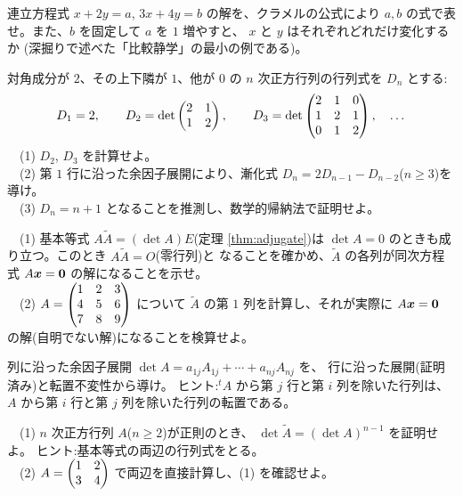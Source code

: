 \begin{mondai}[標準]\label{q:cof-ex8}
連立方程式 $x + 2y = a$, $3x + 4y = b$ の解を、クラメルの公式により
$a, b$ の式で表せ。また、$b$ を固定して $a$ を $1$ 増やすと、
$x$ と $y$ はそれぞれどれだけ変化するか
(深掘りで述べた「比較静学」の最小の例である)。
\end{mondai}

\begin{mondai}[発展]\label{q:cof-ex9}
対角成分が $2$、その上下隣が $1$、他が $0$ の $n$ 次正方行列の行列式を
$D_n$ とする:
\[
D_1 = 2, \qquad D_2 = \det \begin{pmatrix}2 & 1 \\ 1 & 2\end{pmatrix}, \qquad
D_3 = \det \begin{pmatrix}2 & 1 & 0 \\ 1 & 2 & 1 \\ 0 & 1 & 2\end{pmatrix}, \quad \dots
\]
　(1) $D_2$, $D_3$ を計算せよ。\\
　(2) 第 $1$ 行に沿った余因子展開により、漸化式
$D_n = 2D_{n-1} - D_{n-2}$($n \ge 3$)を導け。\\
　(3) $D_n = n + 1$ となることを推測し、数学的帰納法で証明せよ。
\end{mondai}

\begin{mondai}[発展]\label{q:cof-ex10}
　(1) 基本等式 $A\widetilde{A} = (\det A)E$(定理 \ref{thm:adjugate})は
$\det A = 0$ のときも成り立つ。このとき $A\widetilde{A} = O$(零行列)と
なることを確かめ、$\widetilde{A}$ の各列が同次方程式
$A\bm{x} = \bm{0}$ の解になることを示せ。\\
　(2) $A = \begin{pmatrix}1 & 2 & 3 \\ 4 & 5 & 6 \\ 7 & 8 & 9\end{pmatrix}$ について
$\widetilde{A}$ の第 $1$ 列を計算し、それが実際に
$A\bm{x} = \bm{0}$ の解(自明でない解)になることを検算せよ。
\end{mondai}

\begin{mondai}[証明]\label{q:cof-ex11}
列に沿った余因子展開
$\det A = a_{1j} A_{1j} + \cdots + a_{nj} A_{nj}$ を、
行に沿った展開(証明済み)と転置不変性から導け。
ヒント:${}^t\!A$ から第 $j$ 行と第 $i$ 列を除いた行列は、
$A$ から第 $i$ 行と第 $j$ 列を除いた行列の転置である。
\end{mondai}

\begin{mondai}[証明]\label{q:cof-ex12}
　(1) $n$ 次正方行列 $A$($n \ge 2$)が正則のとき、
$\det \widetilde{A} = (\det A)^{n-1}$ を証明せよ。
ヒント:基本等式の両辺の行列式をとる。\\
　(2) $A = \begin{pmatrix}1 & 2 \\ 3 & 4\end{pmatrix}$ で両辺を直接計算し、(1) を確認せよ。
\end{mondai}

